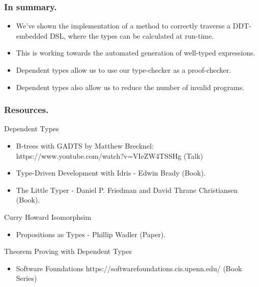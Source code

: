 \documentclass{beamer}
\begin{document}
\begin{frame}[fragile]
  \frametitle{In summary.}
  \begin{itemize}
    \item We've shown the implementation of a method to correctly traverse a
      DDT-embedded DSL, where the types can be calculated at run-time.
    \item This is working towards the automated generation of well-typed
      expressions.
    \item Dependent types allow us to use our type-checker as a proof-checker.
    \item Dependent types also allow us to reduce the number of invalid
      programs.
  \end{itemize}
\end{frame}

\begin{frame}[fragile]
  \frametitle{Resources.}
  \begin{block}{Dependent Types}
    \begin{itemize}
      \item B-trees with GADTS by Matthew Brecknel: 
        https://www.youtube.com/watch?v=VIeZW4TSSHg (Talk)
      \item Type-Driven Development with Idris - Edwin Brady (Book).
      \item The Little Typer - Daniel P. Friedman and David Thrane Christiansen
        (Book).
    \end{itemize}
  \end{block}
  \begin{block}{Curry Howard Isomorphsim}
    \begin{itemize}
      \item Propositions as Types - Phillip Wadler (Paper).
    \end{itemize}
  \end{block}
  \begin{block}{Theorem Proving with Dependent Types}
    \begin{itemize}
      \item Software Foundations 
        https://softwarefoundations.cis.upenn.edu/
        (Book Series)
    \end{itemize}
  \end{block}
\end{frame}
\end{document}
